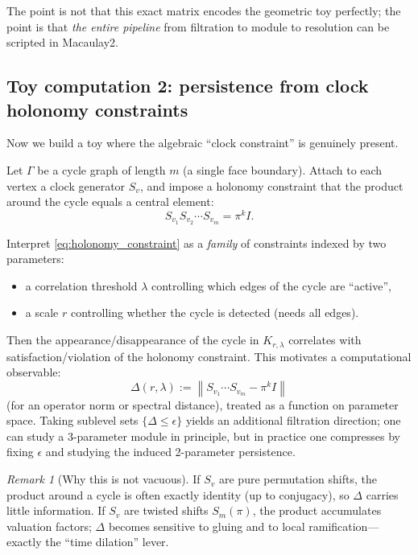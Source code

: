 \documentclass[11pt,oneside]{amsbook}
\numberwithin{equation}{section}
\theoremstyle{plain}
\theoremstyle{definition}
\theoremstyle{remark}
\newtheorem{remark}[theorem]{Remark}
\begin{document}
The point is not that this exact matrix encodes the geometric toy perfectly; the point is that \emph{the entire pipeline} from filtration to module to resolution can be scripted in Macaulay2. 

\subsection{Toy computation 2: persistence from clock holonomy constraints}
\label{sec:toy2}

Now we build a toy where the algebraic ``clock constraint'' is genuinely present.

Let $\Gamma$ be a cycle graph of length $m$ (a single face boundary).
Attach to each vertex a clock generator $S_v$, and impose a holonomy constraint that the product around the cycle equals a central element:
\begin{equation}
\label{eq:holonomy_constraint}
S_{v_1}S_{v_2}\cdots S_{v_m} = \pi^k I.
\end{equation}

Interpret \eqref{eq:holonomy_constraint} as a \emph{family} of constraints indexed by two parameters:
\begin{itemize}
\item a correlation threshold $\lambda$ controlling which edges of the cycle are ``active'',
\item a scale $r$ controlling whether the cycle is detected (needs all edges).
\end{itemize}

Then the appearance/disappearance of the cycle in $K_{r,\lambda}$ correlates with satisfaction/violation of the holonomy constraint.
This motivates a computational observable:
\[
\Delta(r,\lambda) := \left\| S_{v_1}\cdots S_{v_m} - \pi^k I\right\|
\]
(for an operator norm or spectral distance), treated as a function on parameter space.
Taking sublevel sets $\{\Delta\le \epsilon\}$ yields an additional filtration direction; one can study a 3-parameter module in principle, but in practice one compresses by fixing $\epsilon$ and studying the induced 2-parameter persistence.

\begin{remark}[Why this is not vacuous]
If $S_v$ are pure permutation shifts, the product around a cycle is often exactly identity (up to conjugacy), so $\Delta$ carries little information.
If $S_v$ are twisted shifts $S_m(\pi)$, the product accumulates valuation factors; $\Delta$ becomes sensitive to gluing and to local ramification---exactly the ``time dilation'' lever.
\end{remark}
\end{document}

